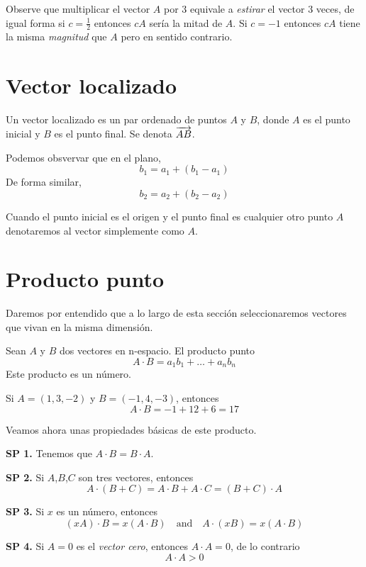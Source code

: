 Observe que multiplicar el vector $A$ por $3$ equivale a \emph{estirar} el vector $3$ veces, de igual forma
si $c=\frac{1}{2}$ entonces $cA$ ser\'ia la mitad de $A$. Si $c=-1$ entonces $cA$ tiene la misma \emph{magnitud}
que $A$ pero en sentido contrario.

\section{Vector localizado}

\begin{definition}
    Un vector localizado es un par ordenado de puntos $A$ y $B$, donde $A$ es el punto inicial y $B$ es el punto final. Se
    denota $\overrightarrow{AB}$.
\end{definition}

Podemos obsvervar que en el plano,
$$ b_{1} = a_{1} + (b_{1} - a_{1}) $$
De forma similar,
$$ b_{2} = a_{2} + (b_{2} - a_{2}) $$

Cuando el punto inicial es el origen y el punto final es cualquier otro punto $A$ denotaremos al vector simplemente como $A$.

\section{Producto punto}

Daremos por entendido que a lo largo de esta sección seleccionaremos vectores que vivan en la misma dimensión.

\begin{definition}
    Sean $A$ y $B$ dos vectores en n-espacio. El producto punto
    $$ A \cdot B = a_{1}b_{1} + \ldots + a_{n}b_{n} $$
    Este producto es un número.
\end{definition}

\begin{myExample}
    Si $A=(1,3,-2)$ y $B=(-1,4,-3)$, entonces
    $$ A \cdot B = -1 + 12 + 6 = 17 $$
\end{myExample}

Veamos ahora unas propiedades básicas de este producto.

\begin{labeling}{}
    \item [\textbf{SP 1.}] Tenemos que $A \cdot B = B \cdot A$.
    \item [\textbf{SP 2.}] Si $A$,$B$,$C$ son tres vectores, entonces
        $$ A \cdot (B+C) = A \cdot B + A \cdot C = (B+C) \cdot A$$
    \item [\textbf{SP 3.}] Si $x$ es un número, entonces
        $$ (xA) \cdot B = x(A \cdot B) \quad \text{and} \quad A \cdot (xB) = x(A \cdot B) $$ 
    \item [\textbf{SP 4.}] Si $A=0$ es el \emph{vector cero}, entonces $A \cdot A = 0$, de lo contrario
        $$ A \cdot A > 0 $$
\end{labeling}

